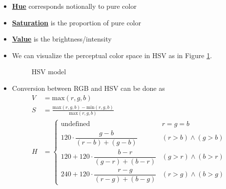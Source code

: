 \documentclass[twocolumn,landscape,10pt]{article}
\theoremstyle{definition}
\begin{document}
\begin{itemize}
    \item \underline{\textbf{Hue}} corresponds notionally to pure color
    \item \underline{\textbf{Saturation}} is the proportion of pure color
    \item \underline{\textbf{Value}} is the brightness/intensity
    \item We can visualize the perceptual color space in HSV as in Figure
        \ref{fig:hsv}.
        \begin{figure}
            \centering
          	\caption{HSV model}\label{fig:hsv}
        \end{figure}
    \item Conversion between RGB and HSV can be done as
        \begin{align*}
            V & = \text{max}(r, g, b) \\
            S & = \frac{\text{max}(r,g,b)-\text{min}(r,g,b)}{\text{max}(r,g,b)}\\
            H & = 
            \begin{cases}
                \text{undefined} & r=g=b \\
                120\cdot \dfrac{g-b}{(r-b)+(g-b)} & (r>b)\wedge(g>b) \\[8px]
                120 + 120\cdot \dfrac{b-r}{(g-r)+(b-r)} & (g>r)\wedge(b>r) \\[8px]
                240 + 120\cdot \dfrac{r-g}{(r-g)+(b-g)} & (r>g)\wedge(b>g)
            \end{cases} 
        \end{align*} 
\end{itemize} 
\end{document}
